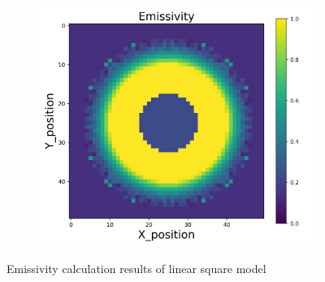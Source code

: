 \begin{figure}[p]
\begin{minipage}{\textwidth}
\begin{subfigure}{0.325\textwidth}
        \end{subfigure}
        \begin{subfigure}{0.325\textwidth}
            \centering
            \includegraphics[width=\textwidth]{figures/raw_data/33/lin_square/emi_cal.jpg}
        \end{subfigure}
    \end{minipage}
    \caption{Emissivity calculation results of linear square model}  
\end{figure}


\newpage
